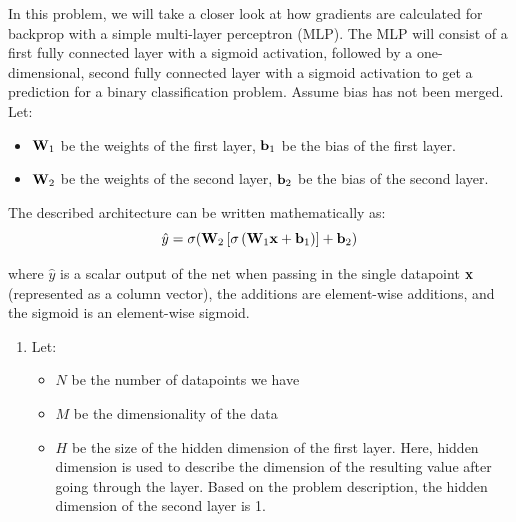 \documentclass[submit]{harvardml}
\begin{document}
\newpage

\begin{problem}

  In this problem, we will take a closer look at how gradients are calculated for backprop with a simple multi-layer perceptron (MLP). The MLP will consist of a first fully connected layer with a sigmoid activation, followed by a one-dimensional, second fully connected layer with a sigmoid activation to get a prediction for a binary classification problem. Assume bias has not been merged. Let:
  \begin{itemize}
      \item $\bold{W}_1$ be the weights of the first layer, $\bold{b}_1$ be the bias of the first layer.
      \item $\bold{W}_2$ be the weights of the second layer, $\bold{b}_2$ be the bias of the second layer.
  \end{itemize}
  
  The described architecture can be written mathematically as: $$\hat{y} = \sigma(\bold{W}_2 \left[\sigma \left(\bold{W}_1 \bold{x} + \bold{b}_1\right)\right] + \bold{b}_2)$$
  
  where $\hat{y}$ is a scalar output of the net when passing in the single datapoint $\bold{x}$ (represented as a column vector), the additions are element-wise additions, and the sigmoid is an element-wise sigmoid.
  
  \begin{enumerate}
      \item Let:
      \begin{itemize}
          \item $N$ be the number of datapoints we have
          \item $M$ be the dimensionality of the data
          \item $H$ be the size of the hidden dimension of the first layer. Here, hidden dimension is used to describe the dimension of the resulting value after going through the layer. Based on the problem description, the hidden dimension of the second layer is 1.
      \end{itemize}
      

\end{enumerate}
\end{problem}
\end{document}
